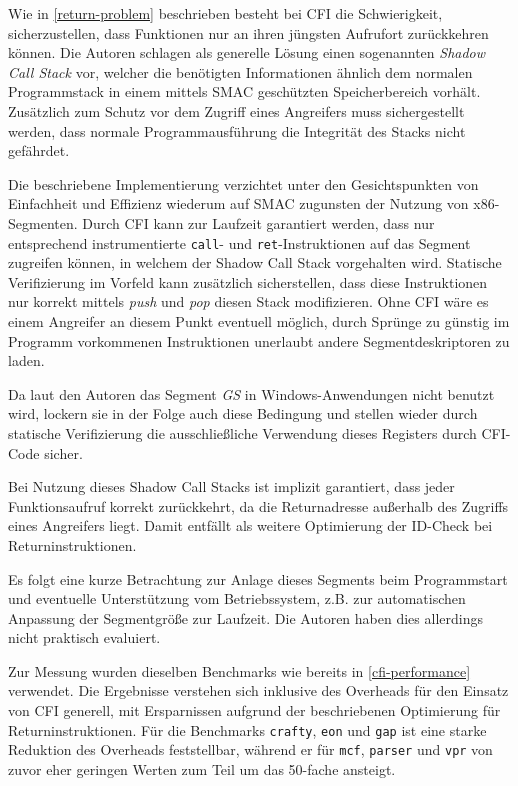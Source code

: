 \documentclass[11pt]{article}
\begin{document}
Wie in \ref{return-problem} beschrieben besteht bei CFI die Schwierigkeit,
sicherzustellen, dass Funktionen nur an ihren jüngsten Aufrufort zurückkehren
können. Die Autoren schlagen als generelle Lösung einen sogenannten
\emph{Shadow Call Stack} vor, welcher die benötigten Informationen ähnlich dem
normalen Programmstack in einem mittels SMAC geschützten Speicherbereich
vorhält. Zusätzlich zum Schutz vor dem Zugriff eines Angreifers muss
sichergestellt werden, dass normale Programmausführung die Integrität des
Stacks nicht gefährdet.

Die beschriebene Implementierung verzichtet unter den Gesichtspunkten von
Einfachheit und Effizienz wiederum auf SMAC zugunsten der Nutzung von
x86-Segmenten. Durch CFI kann zur Laufzeit garantiert werden, dass nur
entsprechend instrumentierte \texttt{call}- und \texttt{ret}-Instruktionen auf
das Segment zugreifen können, in welchem der Shadow Call Stack vorgehalten
wird. Statische Verifizierung im Vorfeld kann zusätzlich sicherstellen, dass
diese Instruktionen nur korrekt mittels \emph{push} und \emph{pop} diesen Stack
modifizieren. Ohne CFI wäre es einem Angreifer an diesem Punkt eventuell
möglich, durch Sprünge zu günstig im Programm vorkommenen Instruktionen
unerlaubt andere Segmentdeskriptoren zu laden.

Da laut den Autoren das Segment \emph{GS} in Windows-Anwendungen nicht benutzt
wird, lockern sie in der Folge auch diese Bedingung und stellen wieder durch
statische Verifizierung die ausschließliche Verwendung dieses Registers durch
CFI-Code sicher.

Bei Nutzung dieses Shadow Call Stacks ist implizit garantiert, dass jeder
Funktionsaufruf korrekt zurückkehrt, da die Returnadresse außerhalb des
Zugriffs eines Angreifers liegt. Damit entfällt als weitere Optimierung der
ID-Check bei Returninstruktionen.

Es folgt eine kurze Betrachtung zur Anlage dieses Segments beim Programmstart
und eventuelle Unterstützung vom Betriebssystem, z.B. zur automatischen
Anpassung der Segmentgröße zur Laufzeit. Die Autoren haben dies allerdings
nicht praktisch evaluiert.

Zur Messung wurden dieselben Benchmarks wie bereits in \ref{cfi-performance}
verwendet. Die Ergebnisse verstehen sich inklusive des Overheads für den
Einsatz von CFI generell, mit Ersparnissen aufgrund der beschriebenen
Optimierung für Returninstruktionen. Für die Benchmarks \texttt{crafty},
\texttt{eon} und \texttt{gap} ist eine starke Reduktion des Overheads
feststellbar, während er für \texttt{mcf}, \texttt{parser} und \texttt{vpr} von
zuvor eher geringen Werten zum Teil um das 50-fache ansteigt.
\end{document}
